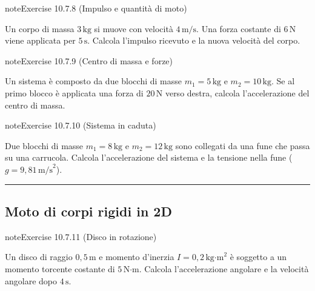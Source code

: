 \documentclass[letterpaper,10pt,italian]{jupyterBook}
\begin{document}
\begin{sphinxadmonition}{note}{Exercise 10.7.8 (Impulso e quantità di moto)}



\sphinxAtStartPar
Un corpo di massa \(3 \, \text{kg}\) si muove con velocità \(4 \, \text{m/s}\). Una forza costante di \(6 \, \text{N}\) viene applicata per \(5 \, \text{s}\). Calcola l’impulso ricevuto e la nuova velocità del corpo.
\end{sphinxadmonition}
 \label{exercise:ch/mechanics/dynamics-problems-exercise-8}

\begin{sphinxadmonition}{note}{Exercise 10.7.9 (Centro di massa e forze)}



\sphinxAtStartPar
Un sistema è composto da due blocchi di masse \(m_1 = 5 \, \text{kg}\) e \(m_2 = 10 \, \text{kg}\). Se al primo blocco è applicata una forza di \(20 \, \text{N}\) verso destra, calcola l’accelerazione del centro di massa.
\end{sphinxadmonition}
 \label{exercise:ch/mechanics/dynamics-problems-exercise-9}

\begin{sphinxadmonition}{note}{Exercise 10.7.10 (Sistema in caduta)}



\sphinxAtStartPar
Due blocchi di masse \(m_1 = 8 \, \text{kg}\) e \(m_2 = 12 \, \text{kg}\) sono collegati da una fune che passa su una carrucola. Calcola l’accelerazione del sistema e la tensione nella fune (\(g = 9,81 \, \text{m/s}^2\)).
\end{sphinxadmonition}


\bigskip\hrule\bigskip



\subsection{Moto di corpi rigidi in 2D}
\label{\detokenize{ch/mechanics/dynamics-problems:moto-di-corpi-rigidi-in-2d}} \label{exercise:ch/mechanics/dynamics-problems-exercise-10}

\begin{sphinxadmonition}{note}{Exercise 10.7.11 (Disco in rotazione)}



\sphinxAtStartPar
Un disco di raggio \(0,5 \, \text{m}\) e momento d’inerzia \(I = 0,2 \, \text{kg·m}^2\) è soggetto a un momento torcente costante di \(5 \, \text{N·m}\). Calcola l’accelerazione angolare e la velocità angolare dopo \(4 \, \text{s}\).
\end{sphinxadmonition}
 \label{exercise:ch/mechanics/dynamics-problems-exercise-11}
\end{document}
